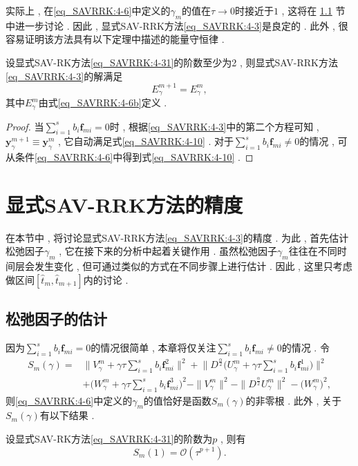实际上 , 在\eqref{eq_SAVRRK:4-6}中定义的$\gamma_m$的值在$\tau\rightarrow 0$时接近于$1$ , 这将在 \ref{Section_SAVRRK: 5-1} 节中进一步讨论 . 
因此 , 显式SAV-RRK方法\eqref{eq_SAVRRK:4-3}是良定的 . 此外 , 很容易证明该方法具有以下定理中描述的能量守恒律 . 
\newpage
\begin{theorem}
设显式SAV-RK方法\eqref{eq_SAVRRK:4-31}的阶数至少为2 , 则显式SAV-RRK方法\eqref{eq_SAVRRK:4-3}的解满足
\begin{equation}
E_{\gamma}^{m+1}=E_{\gamma}^{m} , \label{eq_SAVRRK:4-10}
\end{equation}
其中$E_{\gamma}^{m}$由式\eqref{eq_SAVRRK:4-6b}定义 . 
\end{theorem}

\begin{proof}
当$\sum\limits_{i=1}^s b_i \bm{f}_{m i}=0$时 , 根据\eqref{eq_SAVRRK:4-3}中的第二个方程可知 , $\bm{y}_\gamma^{m+1}\equiv\bm{y}_\gamma^m$ , 它自动满足式\eqref{eq_SAVRRK:4-10} . 
对于$\sum\limits_{i=1}^s b_i \bm{f}_{m i}\neq 0$的情况 , 可从条件\eqref{eq_SAVRRK:4-6}中得到式\eqref{eq_SAVRRK:4-10} . 

\end{proof}

\section{显式SAV-RRK方法的精度}\label{Section_SAVRRK: 5}
在本节中 , 将讨论显式SAV-RRK方法\eqref{eq_SAVRRK:4-3}的精度 . 为此 , 首先估计松弛因子$\gamma_m$ , 它在接下来的分析中起着关键作用 . 
虽然松弛因子$\gamma_m$往往在不同时间层会发生变化 , 但可通过类似的方式在不同步骤上进行估计 . 
因此 , 这里只考虑做区间$\left[\hat{t}_m , \hat{t}_{m+1}\right]$内的讨论 . 

\subsection{松弛因子的估计}\label{Section_SAVRRK: 5-1}

因为$\sum\limits_{i=1}^s b_i \bm{f}_{m i} = 0$的情况很简单 , 本章将仅关注$\sum\limits_{i=1}^s b_i \bm{f}_{m i} \neq 0$的情况 . 
令
\begin{equation}
\begin{aligned}\label{eq_SAVRRK:sm}
S_m(\gamma)=&\big\|V_\gamma^m+\gamma \tau \sum\limits_{i=1}^s b_i \bm{f}_{m i}^2\big\|^2 + \big\|D^\frac{\alpha}{2} \big(U_\gamma^m+\gamma \tau \sum\limits_{i=1}^s b_i \bm{f}_{m i}^1\big)\big\|^2\\
&+\big(W_\gamma^m+\gamma \tau \sum\limits_{i=1}^s b_i \bm{f}_{m i}^3\big)^2-\|V_\gamma^{m}\|^2-\|D^\frac{\alpha}{2} U_\gamma^{m}\|^2-\big(W_\gamma^{m}\big)^2 , 
\end{aligned}
\end{equation}
则\eqref{eq_SAVRRK:4-6}中定义的$\gamma_m$的值恰好是函数$S_m(\gamma)$的非零根 . 
此外 , 关于$S_m(\gamma)$有以下结果 . 
\begin{lemma}\label{lem_SAVRRK:5_1}
设显式SAV-RK方法\eqref{eq_SAVRRK:4-31}的阶数为$p$ , 则有
\begin{equation}
S_m(1)=\mathcal{O}(\tau^{p+1}) . 
\end{equation}
\end{lemma}

